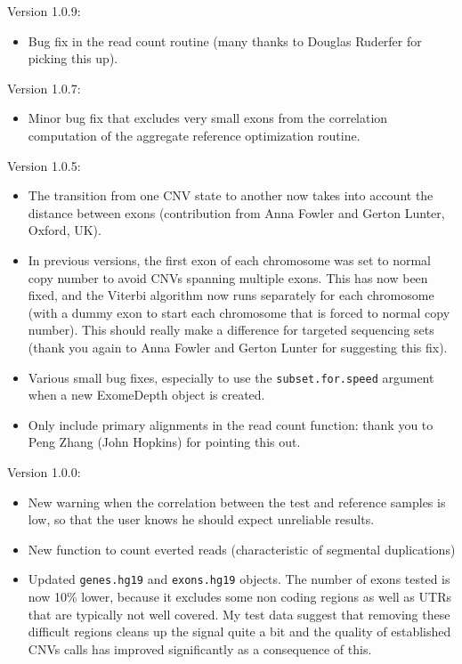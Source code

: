 \documentclass[10pt]{article}
\begin{document}
Version 1.0.9:
\begin{itemize}
\item Bug fix in the read count routine (many thanks to Douglas Ruderfer for picking this up).
\end{itemize}

Version 1.0.7:
\begin{itemize}
\item Minor bug fix that excludes very small exons from the correlation computation of the aggregate reference optimization routine.
\end{itemize}

Version 1.0.5:
\begin{itemize}
\item The transition from one CNV state to another now takes into account the distance between exons (contribution from Anna Fowler and Gerton Lunter, Oxford, UK).
\item In previous versions, the first exon of each chromosome was set to normal copy number to avoid CNVs spanning multiple exons. This has now been fixed, and the Viterbi algorithm now runs separately for each chromosome (with a dummy exon to start each chromosome that is forced to normal copy number). This should really make a difference for targeted sequencing sets (thank you again to Anna Fowler and Gerton Lunter for suggesting this fix).
\item Various small bug fixes, especially to use the \texttt{subset.for.speed} argument when a new ExomeDepth object is created.
\item Only include primary alignments in the read count function: thank you to Peng Zhang (John Hopkins) for pointing this out.
\end{itemize}


Version 1.0.0:
\begin{itemize}
\item New warning when the correlation between the test and reference samples is low, so that the user knows he should expect unreliable results.
\item New function to count everted reads (characteristic of segmental duplications)
\item Updated \texttt{genes.hg19} and \texttt{exons.hg19} objects. The number of exons tested is now 10\% lower, because it excludes some non coding regions as well as UTRs that are typically not well covered. My test data suggest that removing these difficult regions cleans up the signal quite a bit and the quality of established CNVs calls has improved significantly as a consequence of this. 
\end{itemize}
\end{document}
